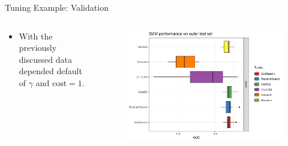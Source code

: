 \begin{frame}{Tuning Example: Validation}

\begin{columns}
\begin{column}{0.4\textwidth}

  \begin{itemize}
      \item With the previously discussed data depended default of $\gamma$ and $\text{cost} = 1$.
  \end{itemize}
\end{column}
\begin{column}{0.6\textwidth}
  \begin{figure}
  \includegraphics[width=\textwidth]{images/benchmark_boxplot_all.png}
  \end{figure}
\end{column}
\end{columns}
\end{frame}
